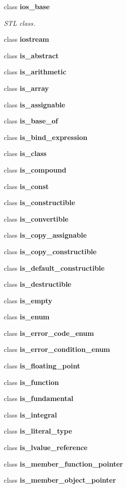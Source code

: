 \begin{DoxyCompactItemize}
class \textbf{ ios\+\_\+base}
\begin{DoxyCompactList}\small\item\em S\+TL class. \end{DoxyCompactList}\item 
class \textbf{ iostream}
\item 
class \textbf{ is\+\_\+abstract}
\item 
class \textbf{ is\+\_\+arithmetic}
\item 
class \textbf{ is\+\_\+array}
\item 
class \textbf{ is\+\_\+assignable}
\item 
class \textbf{ is\+\_\+base\+\_\+of}
\item 
class \textbf{ is\+\_\+bind\+\_\+expression}
\item 
class \textbf{ is\+\_\+class}
\item 
class \textbf{ is\+\_\+compound}
\item 
class \textbf{ is\+\_\+const}
\item 
class \textbf{ is\+\_\+constructible}
\item 
class \textbf{ is\+\_\+convertible}
\item 
class \textbf{ is\+\_\+copy\+\_\+assignable}
\item 
class \textbf{ is\+\_\+copy\+\_\+constructible}
\item 
class \textbf{ is\+\_\+default\+\_\+constructible}
\item 
class \textbf{ is\+\_\+destructible}
\item 
class \textbf{ is\+\_\+empty}
\item 
class \textbf{ is\+\_\+enum}
\item 
class \textbf{ is\+\_\+error\+\_\+code\+\_\+enum}
\item 
class \textbf{ is\+\_\+error\+\_\+condition\+\_\+enum}
\item 
class \textbf{ is\+\_\+floating\+\_\+point}
\item 
class \textbf{ is\+\_\+function}
\item 
class \textbf{ is\+\_\+fundamental}
\item 
class \textbf{ is\+\_\+integral}
\item 
class \textbf{ is\+\_\+literal\+\_\+type}
\item 
class \textbf{ is\+\_\+lvalue\+\_\+reference}
\item 
class \textbf{ is\+\_\+member\+\_\+function\+\_\+pointer}
\item 
class \textbf{ is\+\_\+member\+\_\+object\+\_\+pointer}

\end{DoxyCompactItemize}
